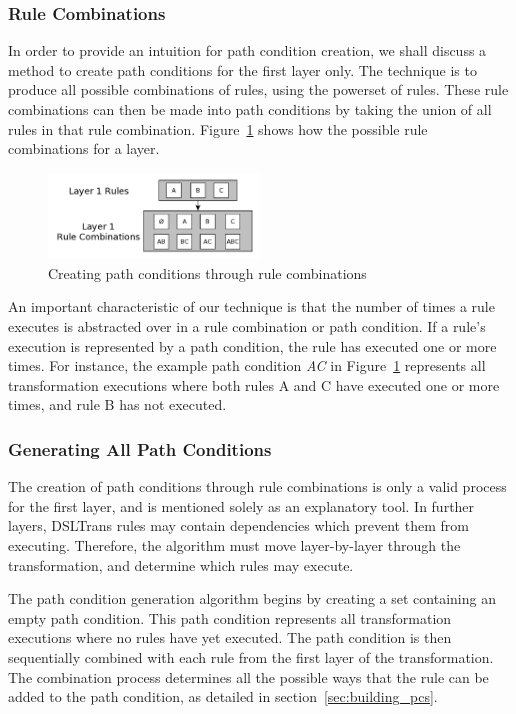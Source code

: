 \subsubsection{Rule Combinations}


In order to provide an intuition for path condition creation, we shall discuss a method to create path conditions for the first layer only. The technique is to produce all possible combinations of rules, using the powerset of rules. These rule combinations can then be made into path conditions by taking the union of all rules in that rule combination. Figure~\ref{fig:first_layer} shows how the possible rule combinations for a layer. 

\begin{figure}[h!]
	\centering
		\includegraphics[width=0.5\textwidth]{./figures/overview/rule_combos.pdf}
	\caption{Creating path conditions through rule combinations}
	\label{fig:first_layer}
\end{figure}

An important characteristic of our technique is that the number of times a rule executes is abstracted over in a rule combination or path condition. If a rule's execution is represented by a path condition, the rule has executed one or more times. For instance, the example path condition \emph{AC} in Figure~\ref{fig:first_layer} represents all transformation executions where both rules A and C have executed one or more times, and rule B has not executed.


\subsubsection{Generating All Path Conditions}

The creation of path conditions through rule combinations is only a valid process for the first layer, and is mentioned solely as an explanatory tool. In further layers, DSLTrans rules may contain dependencies which prevent them from executing. Therefore, the algorithm must move layer-by-layer through the transformation, and determine which rules may execute.

The path condition generation algorithm begins by creating a set containing an empty path condition. This path condition represents all transformation executions where no rules have yet executed. The path condition is then sequentially combined with each rule from the first layer of the transformation. The combination process determines all the possible ways that the rule can be added to the path condition, as detailed in section~\ref{sec:building_pcs}.

